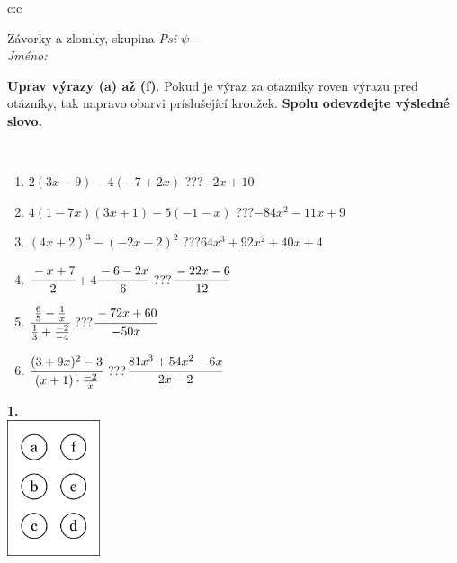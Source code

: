 \documentclass[10pt]{report}
\begin{document}
\begin{tabular}{c:c}
\begin{minipage}[c][104.5mm][t]{0.5\linewidth}
\begin{center}
\vspace{7mm}
{\huge Závorky a zlomky, skupina \textit{Psi $\psi$} -}\\[5mm]
\textit{Jméno:}\phantom{xxxxxxxxxxxxxxxxxxxxxxxxxxxxxxxxxxxxxxxxxxxxxxxxxxxxxxxxxxxxxxxxx}\\[5mm]
\begin{minipage}{0.95\linewidth}
\begin{center}
\textbf{Uprav výrazy (a) až (f)}. Pokud je výraz za otazníky roven výrazu pred otázniky, tak napravo obarvi príslušející kroužek. \textbf{Spolu odevzdejte výsledné slovo.}
\end{center}
\end{minipage}
\\[1mm]
\begin{minipage}{0.79\linewidth}
\begin{center}
\begin{varwidth}{\linewidth}
\begin{enumerate}
\normalsize
\item $2(3x-9)-4(-7+2x)$\quad \dotfill\; ???\;\dotfill \quad $-2x+10$
\item $4(1-7x)(3x+1)-5(-1-x)$\quad \dotfill\; ???\;\dotfill \quad $-84x^2-11x+9$
\item $(4x+2)^3-(-2x-2)^2$\quad \dotfill\; ???\;\dotfill \quad $64x^3+92x^2+40x+4$
\item $\cfrac{-x+7}{2}+4\cfrac{-6-2x}{6}$\quad \dotfill\; ???\;\dotfill \quad $\cfrac{-22x-6}{12}$
\item $\cfrac{\frac{6}{5}-\frac{1}{x}}{\frac{1}{3}+\frac{-2}{-4}}$\quad \dotfill\; ???\;\dotfill \quad $\cfrac{-72x+60}{-50x}$
\item $\cfrac{(3+9x)^2-3}{(x+1)\cdot\frac{-2}{x}}$\quad \dotfill\; ???\;\dotfill \quad $\cfrac{81x^3+54x^2-6x}{2x-2}$
\end{enumerate}
\end{varwidth}
\end{center}
\end{minipage}
\begin{minipage}{0.20\linewidth}
\begin{center}
{\Huge\bfseries 1.} \\[2mm]
\includegraphics[height=40mm]{../images/braille.png}

\end{center}
\end{minipage}
\end{center}
\end{minipage}
\end{tabular}
\end{document}
